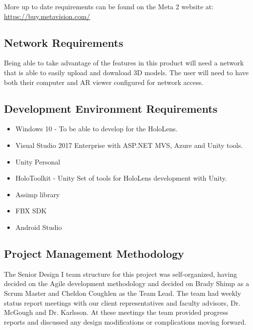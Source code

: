 More up to date requirements can be found on the Meta 2 website at: 
\url{https://buy.metavision.com/}

\subsection{Network Requirements}

Being able to take advantage of the features in this product will need a network
that is able to easily upload and download 3D models. The user will need to have
both their computer and AR viewer configured for network access.

\subsection{Development Environment Requirements}
\begin{itemize}
	\item Windows 10 - To be able to develop for the HoloLens.
	\item Visual Studio 2017 Enterprise with ASP.NET MVS, Azure and Unity tools.
	\item Unity Personal
	\item HoloToolkit - Unity Set of tools for HoloLens development with Unity.
	\item Assimp library
	\item FBX SDK
	\item Android Studio
\end{itemize}


\subsection{Project Management Methodology}

The Senior Design I team structure for this project was self-organized, having decided on the Agile development methodology and decided on Brady Shimp as a Scrum Master and Cheldon Coughlen as the Team Lead. The team had weekly status report meetings with our client representatives and faculty advisors, Dr. McGough and Dr. Karlsson. At these meetings the team provided progress reports and discussed any design modifications or complications moving forward.\\

